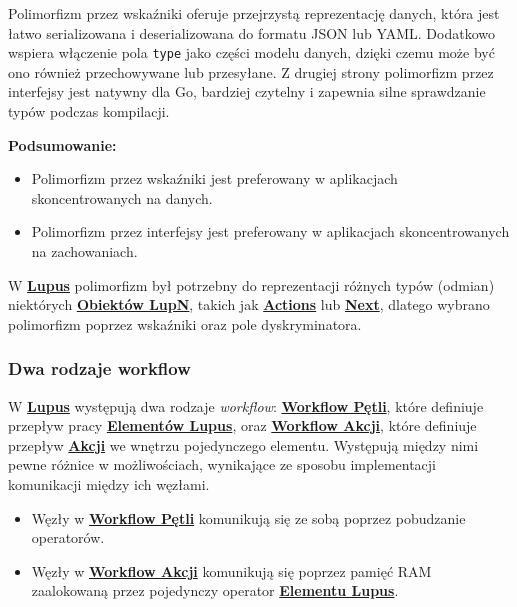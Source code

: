 Polimorfizm przez wskaźniki oferuje przejrzystą reprezentację danych, która jest łatwo serializowana i deserializowana do formatu JSON lub YAML. Dodatkowo wspiera włączenie pola \texttt{type} jako części modelu danych, dzięki czemu może być ono również przechowywane lub przesyłane. Z drugiej strony polimorfizm przez interfejsy jest natywny dla Go, bardziej czytelny i zapewnia silne sprawdzanie typów podczas kompilacji.

\textbf{Podsumowanie:}

\begin{itemize}
    \item Polimorfizm przez wskaźniki jest preferowany w aplikacjach skoncentrowanych na danych.
    \item Polimorfizm przez interfejsy jest preferowany w aplikacjach skoncentrowanych na zachowaniach.
\end{itemize}

W \hyperlink{def:lupus}{\textbf{Lupus}} polimorfizm był potrzebny do reprezentacji różnych typów (odmian) niektórych \hyperlink{def:element}{\textbf{Obiektów LupN}}, takich jak \hyperlink{def:akcja}{\textbf{Actions}} lub \hyperlink{def:next}{\textbf{Next}}, dlatego wybrano polimorfizm poprzez wskaźniki oraz pole dyskryminatora.

\subsubsection{Dwa rodzaje workflow}\label{sec:dwa-rodzaje-workflow}

W \hyperlink{def:lupus}{\textbf{Lupus}} występują dwa rodzaje \textit{workflow}: \hyperlink{def:workflow-petli}{\textbf{Workflow Pętli}}, które definiuje przepływ pracy \hyperlink{def:element-lupus}{\textbf{Elementów Lupus}}, oraz \hyperlink{def:workflow-petli}{\textbf{Workflow Akcji}}, które definiuje przepływ \hyperlink{def:akcja}{\textbf{Akcji}} we wnętrzu pojedynczego elementu. Występują między nimi pewne różnice w możliwościach, wynikające ze sposobu implementacji komunikacji między ich węzłami.

\begin{itemize}
    \item Węzły w \hyperlink{def:workflow-petli}{\textbf{Workflow Pętli}} komunikują się ze sobą poprzez pobudzanie operatorów.
    \item Węzły w \hyperlink{def:workflow-petli}{\textbf{Workflow Akcji}} komunikują się poprzez pamięć RAM zaalokowaną przez pojedynczy operator \hyperlink{def:element-lupus}{\textbf{Elementu Lupus}}.
\end{itemize}

